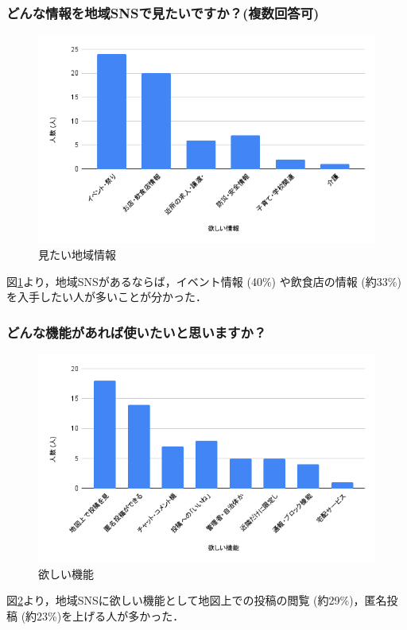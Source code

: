 \subsubsection{どんな情報を地域SNSで見たいですか？(複数回答可)}
\begin{figure}[H]
    \centering
    \includegraphics[width=0.5\linewidth]{fig125/Q4.png}
    \caption{見たい地域情報}
    \label{fig:Q4}
\end{figure}
図\ref{fig:Q4}より，地域SNSがあるならば，イベント情報 (40\%) や飲食店の情報 (約33\%)を入手したい人が多いことが分かった．

\subsubsection{どんな機能があれば使いたいと思いますか？}
\begin{figure}[H]
    \centering
    \includegraphics[width=0.5\linewidth]{fig125/Q7.png}
    \caption{欲しい機能}
    \label{fig:Q7}
\end{figure}
図\ref{fig:Q7}より，地域SNSに欲しい機能として地図上での投稿の閲覧 (約29\%)，匿名投稿 (約23\%)を上げる人が多かった．

